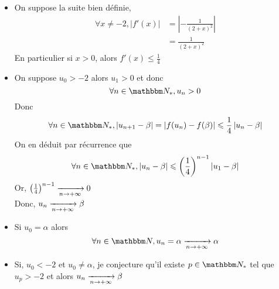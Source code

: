 \begin{enumerate}
		\begin{itemize}
			\item On suppose la suite bien définie, 
				\begin{align*}
					\forall x \neq -2, \left| f'(x) \right| &= \left| -\frac{1}{(2+x)^2} \right|\\
																									&= \frac{1}{(2+x)^2}
				\end{align*}
				En particulier si $x>0$, alors $f'(x) \le \frac{1}{4}$ 
			\item On suppose $u_0 > -2$ alors $u_1 >0$ et donc \[
				\forall  n \in  \N_*, u_n > 0
				\] Donc \[
				\forall  n \in \N_*, \left| u_{n+1} - \beta \right| = \left| f(u_n) - f(\beta) \right| \le \frac{1}{4} \left| u_n - \beta \right| 
				\] On en déduit par récurrence que \[
				\forall n \in \N_*, \left| u_n- \beta \right| \le \left( \frac{1}{4} \right) ^{n-1} \left| u_1 - \beta \right| 
				\] Or, $\left( \frac{1}{4} \right)^{n-1} \xrightarrow[n \to +\infty]{} 0$\\
				Donc, $u_n \xrightarrow[n \to  +\infty]{} \beta$
			\item Si $u_0 = \alpha$ alors \[
					\forall n \in \N, u_n = \alpha \tendsto{n \to +\infty} \alpha
				\] 
			\item Si, $u_0 < -2$ et $u_0 \neq \alpha$, je conjecture qu'il existe $p \in \N_*$ tel que $u_p > -2$ et alors $u_n \xrightarrow[n \to +\infty]{} \beta$
		\end{itemize}
\end{enumerate}
